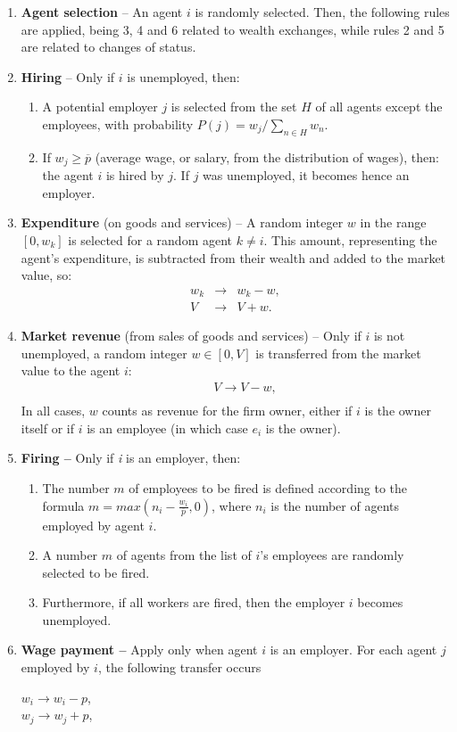 \begin{enumerate}
\item \textbf{Agent selection} -- An agent $i$ is randomly selected. Then, the following rules are applied, being 3, 4 and 6 related to wealth exchanges, while rules 2 and 5 are related to changes of status. 
\item \textbf{Hiring} -- Only if $i$ is unemployed, then: 
\begin{enumerate}
\item A potential employer $j$ is selected from the set $H$ of all agents except the employees, with probability $P(j)=w_{j}/\sum_{n\in H}w_{n}$.
\item If $w_{j}\ge\overline{p}$ (average wage, or salary, from the distribution of wages), then: the agent $i$ is hired by $j$. If $j$ was unemployed, it becomes hence an employer.
\end{enumerate}
\item \textbf{Expenditure} (on goods and services) -- A random integer $w$ in the range $\left[0,w_{k}\right]$ is selected for a random agent $k\neq i$. This amount, representing the agent's expenditure, is subtracted from their wealth and added to the market value, so: 
\begin{eqnarray*}
w_{k} & \to & w_{k}-w,\\
V & \to & V+w.
\end{eqnarray*}
\item \textbf{Market revenue} (from sales of goods and services) -- Only if $i$ is not unemployed, a random integer $w\in[0,V]$ is transferred from the market value to the agent $i$: 
\begin{eqnarray*}
 &  & V\to V-w,\\
\end{eqnarray*}
In all cases, $w$ counts as revenue for the firm owner, either if $i$ is the owner itself or if $i$ is an employee (in which case $e_{i}$ is the owner).
\item \textbf{Firing --} Only if \textit{i} is an employer, then:
\begin{enumerate}
\item The number $m$ of employees to be fired is defined according to the formula $m=max(n_{i}-\frac{w_{i}}{\overline{p}},0)$, where $n_{i}$ is the number of agents employed by agent $i$.
\item A number $m$ of agents from the list of $i$'s employees are randomly selected to be fired.
\item Furthermore, if all workers are fired, then the employer $i$ becomes unemployed.
\end{enumerate}
\item \textbf{Wage payment --} Apply only when agent $i$ is an employer. For each agent $j$ employed by $i$, the following transfer occurs 
\begin{center}
$w_{i}\to w_{i}-p$, \\
 $w_{j}\to w_{j}+p$, 
\par\end{center}


\end{enumerate}
